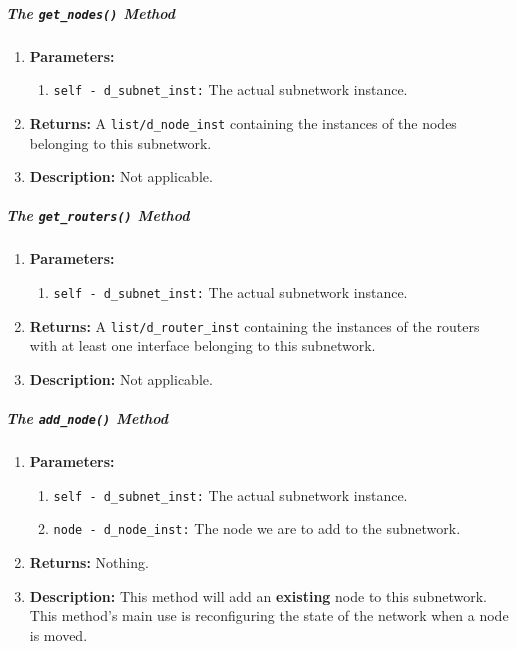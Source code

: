                     \subparagraph{The \texttt{get\_nodes()} Method}
                        \begin{enumerate}
                            \item \textbf{Parameters:}
                            \begin{enumerate}
                                \item \texttt{self - d\_subnet\_inst:} The actual subnetwork instance.
                            \end{enumerate}
                            \item \textbf{Returns:} A \texttt{list/d\_node\_inst} containing the instances of the nodes belonging to this subnetwork.
                            \item \textbf{Description:} Not applicable.
                        \end{enumerate}

                    \subparagraph{The \texttt{get\_routers()} Method}
                        \begin{enumerate}
                            \item \textbf{Parameters:}
                            \begin{enumerate}
                                \item \texttt{self - d\_subnet\_inst:} The actual subnetwork instance.
                            \end{enumerate}
                            \item \textbf{Returns:} A \texttt{list/d\_router\_inst} containing the instances of the routers with at least one interface belonging to this subnetwork.
                            \item \textbf{Description:} Not applicable.
                        \end{enumerate}

                    \subparagraph{The \texttt{add\_node()} Method}
                        \begin{enumerate}
                            \item \textbf{Parameters:}
                            \begin{enumerate}
                                \item \texttt{self - d\_subnet\_inst:} The actual subnetwork instance.
                                \item \texttt{node - d\_node\_inst:} The node we are to add to the subnetwork.
                            \end{enumerate}
                            \item \textbf{Returns:} Nothing.
                            \item \textbf{Description:} This method will add an \textbf{existing} node to this subnetwork. This method's main use is reconfiguring the state of the network when a node is moved.
                        \end{enumerate}

